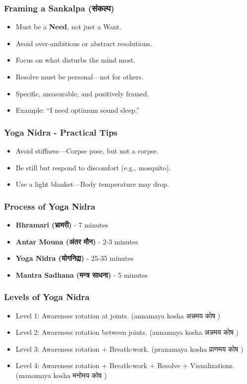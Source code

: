 \begin{frame}[fragile]\frametitle{Framing a Sankalpa (संकल्प)}
      \begin{itemize}
        \item Must be a \textbf{Need}, not just a Want.
        \item Avoid over-ambitious or abstract resolutions.
        \item Focus on what disturbs the mind most.
        \item Resolve must be personal—not for others.
        \item Specific, measurable, and positively framed.
        \item Example: “I need optimum sound sleep.”
      \end{itemize}
\end{frame}

\begin{frame}[fragile]\frametitle{Yoga Nidra - Practical Tips}
      \begin{itemize}
        \item Avoid stiffness—Corpse pose, but not a corpse.
        \item Be still but respond to discomfort (e.g., mosquito).
        \item Use a light blanket—Body temperature may drop.
      \end{itemize}
\end{frame}

\begin{frame}[fragile]\frametitle{Process of Yoga Nidra}
      \begin{itemize}
        \item \textbf{Bhramari (भ्रामरी)} - 7 minutes
        \item \textbf{Antar Mouna (अंतर मौन)} - 2-3 minutes
        \item \textbf{Yoga Nidra (योगनिद्रा)} - 25-35 minutes
        \item \textbf{Mantra Sadhana (मन्त्र साधना)} - 5 minutes
      \end{itemize}
\end{frame}

\begin{frame}[fragile]\frametitle{Levels of Yoga Nidra}
      \begin{itemize}
        \item Level 1: Awareness rotation at joints. (annamaya kosha अन्नमय कोष )
        \item Level 2: Awareness rotation between joints. (annamaya kosha अन्नमय कोष )
        \item Level 3: Awareness rotation + Breath-work. (pranamaya kosha प्राणमय कोष )
        \item Level 4: Awareness rotation + Breath-work + Resolve + Visualizations. (manomaya kosha मनोमय कोष )
      \end{itemize}
\end{frame}

